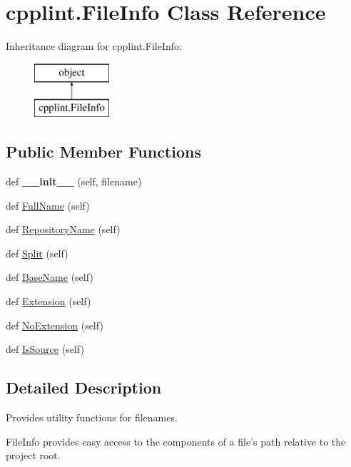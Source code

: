 \hypertarget{classcpplint_1_1FileInfo}{}\section{cpplint.\+File\+Info Class Reference}
\label{classcpplint_1_1FileInfo}
Inheritance diagram for cpplint.\+File\+Info\+:\begin{figure}[H]
\begin{center}
\leavevmode
\includegraphics[height=2.000000cm]{classcpplint_1_1FileInfo}
\end{center}
\end{figure}
\subsection*{Public Member Functions}
\begin{DoxyCompactItemize}
\item 
def {\bfseries \+\_\+\+\_\+init\+\_\+\+\_\+} (self, filename)\hypertarget{classcpplint_1_1FileInfo_abd3ff77aab027af2476b3a1d97b1f89c}{}\label{classcpplint_1_1FileInfo_abd3ff77aab027af2476b3a1d97b1f89c}

\item 
def \hyperlink{classcpplint_1_1FileInfo_aed56577368c45cdf45fc4c9109129145}{Full\+Name} (self)
\item 
def \hyperlink{classcpplint_1_1FileInfo_a2b3b79b7d46221a6b9d0ea0bebac2061}{Repository\+Name} (self)
\item 
def \hyperlink{classcpplint_1_1FileInfo_a43f1c5ff1771da52e29c60c114955e72}{Split} (self)
\item 
def \hyperlink{classcpplint_1_1FileInfo_a1a12ed63ddc2ffd8f6a105e3ab4d6289}{Base\+Name} (self)
\item 
def \hyperlink{classcpplint_1_1FileInfo_a2554b504117839931e901b59a59c67ae}{Extension} (self)
\item 
def \hyperlink{classcpplint_1_1FileInfo_acb46555a72b346966f4bf28c08e3b1fa}{No\+Extension} (self)
\item 
def \hyperlink{classcpplint_1_1FileInfo_a157f8d3266d7291321db88cdad3b2879}{Is\+Source} (self)
\end{DoxyCompactItemize}


\subsection{Detailed Description}
\begin{DoxyVerb}Provides utility functions for filenames.

FileInfo provides easy access to the components of a file's path
relative to the project root.
\end{DoxyVerb}
 


